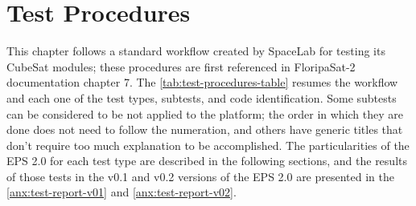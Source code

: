 %
%
%
%
%

%
%
%
%
%
%

\chapter{Test Procedures} \label{ch:test-procedures}

This chapter follows a standard workflow created by SpaceLab for testing its CubeSat modules; these procedures are first referenced in FloripaSat-2 documentation chapter 7\cite{floripasat2-doc}. The \autoref{tab:test-procedures-table} resumes the workflow and each one of the test types, subtests, and code identification. Some subtests can be considered to be not applied to the platform; the order in which they are done does not need to follow the numeration, and others have generic titles that don't require too much explanation to be accomplished. The particularities of the EPS 2.0 for each test type are described in the following sections, and the results of those tests in the v0.1 and v0.2 versions of the EPS 2.0 are presented in the \autoref{anx:test-report-v01} and \autoref{anx:test-report-v02}.

